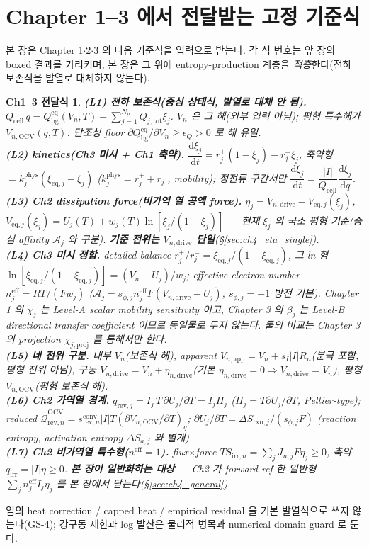 \documentclass[11pt,a4paper]{article}
\newtheorem*{linkbox}{Ch1--3 전달식}
\newcommand{\dd}{\mathrm{d}}
\newcommand{\eff}{\mathrm{eff}}
\newcommand{\eq}{\mathrm{eq}}
\newcommand{\app}{\mathrm{app}}
\newcommand{\drive}{\mathrm{drive}}
\newcommand{\bg}{\mathrm{bg}}
\newcommand{\cell}{\mathrm{cell}}
\newcommand{\OCV}{\mathrm{OCV}}
\newcommand{\tot}{\mathrm{tot}}
\newcommand{\irr}{\mathrm{irr}}
\newcommand{\rev}{\mathrm{rev}}
\newcommand{\rxn}{\mathrm{rxn}}
\newcommand{\conv}{\mathrm{conv}}
\begin{document}
\section{Chapter 1--3 에서 전달받는 고정 기준식}\label{sec:ch4_inherit}
본 장은 Chapter 1$\cdot$2$\cdot$3 의 다음 기준식을 입력으로 받는다.
각 식 번호는 앞 장의 boxed 결과를 가리키며, 본 장은 그 위에 entropy-production 계층을 \emph{적층}한다(전하
보존식을 발열로 대체하지 않는다).
\begin{linkbox}
\textbf{(L1) 전하 보존식(중심 상태식, 발열로 대체 안 됨).} $Q_\cell\,q=Q_\bg^{\eq}(V_n,T)+\sum_{j=1}^{N_p}Q_{j,\tot}\xi_j$.
$V_n$ 은 그 해(외부 입력 아님); 평형 특수해가 $V_{n,\OCV}(q,T)$. 단조성 floor $\partial Q_\bg^{\eq}/\partial V_n\ge\epsilon_Q>0$
로 해 유일.\\
\textbf{(L2) kinetics(Ch3 미시 + Ch1 축약).} $\dfrac{\dd\xi_j}{\dd t}=r_j^+(1-\xi_j)-r_j^-\xi_j$, 축약형
$=k_j^{\mathrm{phys}}(\xi_{\eq,j}-\xi_j)$ ($k_j^{\mathrm{phys}}=r_j^++r_j^-$, mobility); 정전류 구간서만
$\dfrac{\dd\xi_j}{\dd t}=\dfrac{|I|}{Q_\cell}\dfrac{\dd\xi_j}{\dd q}$.\\
\textbf{(L3) Ch2 dissipation force(비가역 열 공액 force).} $\eta_j=V_{n,\drive}-V_{\eq,j}(\xi_j)$,
$V_{\eq,j}(\xi_j)=U_j(T)+w_j(T)\ln[\xi_j/(1-\xi_j)]$ — 현재 $\xi_j$ 의 \emph{국소 평형} 기준(중심 affinity
$\mathcal A_j$ 와 구분). \textbf{기준 전위는 $V_{n,\drive}$ 단일}(\S\ref{sec:ch4_eta_single}).\\
\textbf{(L4) Ch3 미시 정합.} detailed balance $r_j^+/r_j^-=\xi_{\eq,j}/(1-\xi_{\eq,j})$, 그 ln 형
$\ln[\xi_{\eq,j}/(1-\xi_{\eq,j})]=(V_n-U_j)/w_j$; effective electron number $n_j^{\eff}=RT/(Fw_j)$ ($\mathcal A_j
=s_{\phi,j}n_j^{\eff}F(V_{n,\drive}-U_j)$, $s_{\phi,j}=+1$ 방전 기본). Chapter 1 의 $\chi_j$ 는 Level-A scalar
mobility sensitivity 이고, Chapter 3 의 $\beta_j$ 는 Level-B directional transfer coefficient 이므로 동일물로
두지 않는다. 둘의 비교는 Chapter 3 의 projection $\chi_{j,\mathrm{proj}}$ 를 통해서만 한다.\\
\textbf{(L5) 네 전위 구분.} 내부 $V_n$(보존식 해), apparent $V_{n,\app}=V_n+s_I|I|R_n$(분극 포함, 평형 전위
아님), 구동 $V_{n,\drive}=V_n+\eta_{n,\drive}$(기본 $\eta_{n,\drive}=0\Rightarrow V_{n,\drive}=V_n$), 평형
$V_{n,\OCV}$(평형 보존식 해).\\
\textbf{(L6) Ch2 가역열 경계.} $q_{\rev,j}=I_j\,T\,\partial U_j/\partial T=I_j\Pi_j$ ($\Pi_j=T\partial U_j/\partial T$,
Peltier-type); reduced $\dot{\mathcal Q}_{\rev,n}^{\OCV}=s_{\rev,n}^{\conv}|I|T(\partial V_{n,\OCV}/\partial T)_q$;
$\partial U_j/\partial T=\Delta S_{\rxn,j}/(s_{\phi,j}F)$ (reaction entropy, activation entropy $\Delta S_{a,j}$
와 별개).\\
\textbf{(L7) Ch2 비가역열 특수형($n^{\eff}=1$).} flux$\times$force $T\dot S_{\irr,n}=\sum_j J_{n,j}F\eta_j\ge0$,
축약 $q_\irr=|I|\eta\ge0$. \textbf{본 장이 일반화하는 대상} — Ch2 가 forward-ref 한 일반형 $\sum_j n_j^{\eff}I_j\eta_j$
를 본 장에서 닫는다(\S\ref{sec:ch4_general}).
\end{linkbox}
임의 heat correction / capped heat / empirical residual 을 기본 발열식으로 쓰지 않는다(GS-4); 강구동 제한과
log 발산은 물리적 병목과 numerical domain guard 로 둔다.
\end{document}
